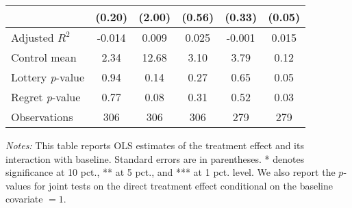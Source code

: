 \begin{table}[htbp]
{\begin{threeparttable}
\begin{tabular}{l*{5}{c}}
                &   (0.20)         &   (2.00)         &   (0.56)         &   (0.33)         &   (0.05)         \\
\midrule
Adjusted \(R^{2}\)&   -0.014         &    0.009         &    0.025         &   -0.001         &    0.015         \\
Control mean    &     2.34         &    12.68         &     3.10         &     3.79         &     0.12         \\
Lottery \emph{p}-value&     0.94         &     0.14         &     0.27         &     0.65         &     0.05         \\
Regret \emph{p}-value&     0.77         &     0.08         &     0.31         &     0.52         &     0.03         \\
Observations    &      306         &      306         &      306         &      279         &      279         \\
\bottomrule \end{tabular} \begin{tablenotes}[flushleft] \footnotesize \item \emph{Notes:} This table reports OLS estimates of the treatment effect and its interaction with baseline. Standard errors are in parentheses. * denotes significance at 10 pct., ** at 5 pct., and *** at 1 pct. level. We also report the \(p\)-values for joint tests on the direct treatment effect conditional on the baseline covariate $= 1$. \end{tablenotes} \end{threeparttable} } \end{table}
